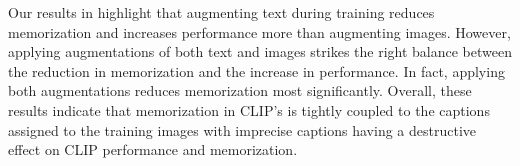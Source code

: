Our results in  highlight that augmenting text during training reduces memorization and increases performance more than augmenting images. However, applying augmentations of both text and images strikes the right balance between the reduction in memorization and the increase in performance. In fact, applying both augmentations reduces memorization most significantly. 
Overall, these results indicate that memorization in CLIP's is tightly coupled to the captions assigned to the training images with imprecise captions having a destructive effect on CLIP performance and memorization.

